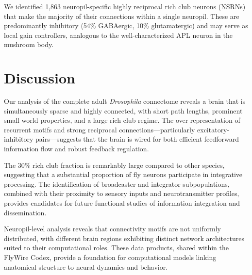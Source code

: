 \documentclass[11pt]{article}
\begin{document}
We identified 1,863 neuropil-specific highly reciprocal rich club neurons (NSRNs) that make the majority of their connections within a single neuropil. These are predominantly inhibitory (54\% GABAergic, 10\% glutamatergic) and may serve as local gain controllers, analogous to the well-characterized APL neuron in the mushroom body.

\section{Discussion}

Our analysis of the complete adult \textit{Drosophila} connectome reveals a brain that is simultaneously sparse and highly connected, with short path lengths, prominent small-world properties, and a large rich club regime. The over-representation of recurrent motifs and strong reciprocal connections---particularly excitatory-inhibitory pairs---suggests that the brain is wired for both efficient feedforward information flow and robust feedback regulation.

The 30\% rich club fraction is remarkably large compared to other species, suggesting that a substantial proportion of fly neurons participate in integrative processing. The identification of broadcaster and integrator subpopulations, combined with their proximity to sensory inputs and neurotransmitter profiles, provides candidates for future functional studies of information integration and dissemination.

Neuropil-level analysis reveals that connectivity motifs are not uniformly distributed, with different brain regions exhibiting distinct network architectures suited to their computational roles. These data products, shared within the FlyWire Codex, provide a foundation for computational models linking anatomical structure to neural dynamics and behavior.



\end{document}
